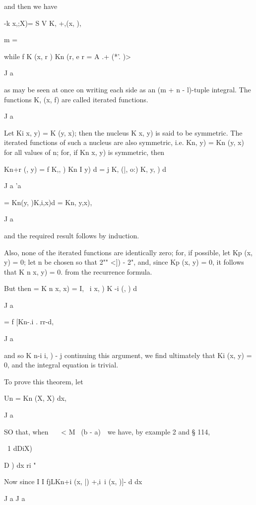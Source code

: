 {and then we have

-k x,;X)= S V K, +,(x, ),

m =

while f K (x, r ) Kn (r, e r = A .+ (*'. )>

J a

as may be seen at once on writing each side as an (m + n - l)-tuple
integral. The functions K, (x, f) are called iterated functions.

J a

%
%


Let Ki x, y) = K (y, x); then the nucleus K x, y) is said to be
symmetric. The iterated functions of such a nucleus are also
symmetric, i.e. Kn, y) = Kn (y, x) for all values of n; for, if Kn
x, y) is symmetric, then

Kn+r (, y) = f K,, ) Kn I y) d = j K, (|, o:) K, y, ) d

J a 'a

= Kn(y, )K,i,x)d = Kn, y,x),

J a

and the required result follows by induction.

Also, none of the iterated functions are identically zero; for, if
possible, let Kp (x, y) = 0; let n be chosen so that 2"" <]) - 2",
and, since Kp (x, y) = 0, it follows that K n x, y) = 0. from the
recurrence formula.

But then = K n x, x) = I, \ i x, ) K -i (, ) d

J a

= f [Kn-.i . rr-d,

J a

and so K n-i i, ) - j continuing this argument, we find ultimately
that Ki (x, y) = 0, and the integral equation is trivial.


To prove this theorem, let

Un = Kn (X, X) dx,

J a

SO that, when \ \ \ < M~ (b - a)~\ we have, by example 2 and §
114,

\ 1 dDiX)

D ) dx ri " 

Now since I I fjLKn+i (x, |) +,i\ i (x, )]- d dx

J a J a

}
